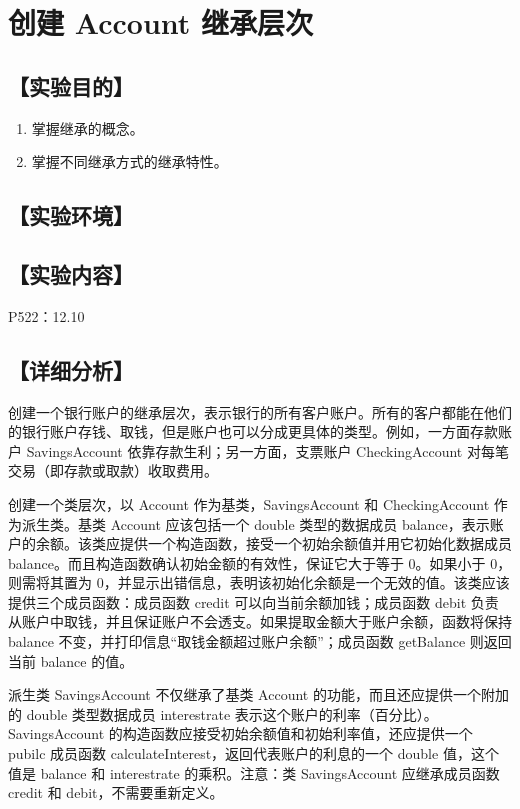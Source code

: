\section{创建 Account 继承层次}
\hfill{}
\subsection*{【实验目的】}
\begin{enumerate}[topsep=0pt,partopsep=0pt,itemsep=0pt,parsep=0pt,label={\arabic*、}]
\item 掌握继承的概念。
\item 掌握不同继承方式的继承特性。
\end{enumerate}
\subsection*{【实验环境】}
\MyEnvironment
\subsection*{【实验内容】}
P522：12.10
\subsection*{【详细分析】}
创建一个银行账户的继承层次，表示银行的所有客户账户。所有的客户都能在他们的银行账户存钱、取钱，但是账户也可以分成更具体的类型。例如，一方面存款账户 SavingsAccount 依靠存款生利；另一方面，支票账户 CheckingAccount 对每笔交易（即存款或取款）收取费用。

创建一个类层次，以 Account 作为基类，SavingsAccount 和 CheckingAccount 作为派生类。基类 Account 应该包括一个 double 类型的数据成员 balance，表示账户的余额。该类应提供一个构造函数，接受一个初始余额值并用它初始化数据成员 balance。而且构造函数确认初始金额的有效性，保证它大于等于 0。如果小于 0，则需将其置为 0，并显示出错信息，表明该初始化余额是一个无效的值。该类应该提供三个成员函数：成员函数 credit 可以向当前余额加钱；成员函数 debit 负责从账户中取钱，并且保证账户不会透支。如果提取金额大于账户余额，函数将保持 balance 不变，并打印信息“取钱金额超过账户余额”；成员函数 getBalance 则返回当前 balance 的值。

派生类 SavingsAccount 不仅继承了基类 Account 的功能，而且还应提供一个附加的 double 类型数据成员 interestrate 表示这个账户的利率（百分比）。SavingsAccount 的构造函数应接受初始余额值和初始利率值，还应提供一个 pubilc 成员函数 calculateInterest，返回代表账户的利息的一个 double 值，这个值是 balance 和 interestrate 的乘积。注意：类 SavingsAccount 应继承成员函数 credit 和 debit，不需要重新定义。

